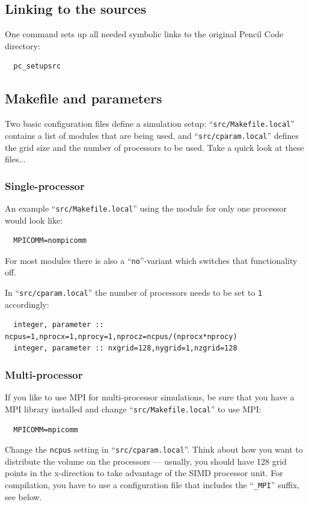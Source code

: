 \documentclass[a4paper,12pt]{article}
\newcommand{\file}[1]{``\texttt{#1}''}
\newcommand{\name}[1]{\textsc{#1}}
\newcommand{\code}[1]{\texttt{#1}}
\begin{document}
\subsection{Linking to the sources}

One command sets up all needed symbolic links to the original Pencil Code directory:
\begin{verbatim}
  pc_setupsrc
\end{verbatim}

\subsection{Makefile and parameters}

Two basic configuration files define a simulation setup: \file{src/Makefile.local} contains a list of modules that are being used, and \file{src/cparam.local} defines the grid size and the number of processors to be used.
Take a quick look at these files...


\subsubsection{Single-processor}
An example \file{src/Makefile.local} using the module for only one processor would look like:
\begin{verbatim}
  MPICOMM=nompicomm
\end{verbatim}

For most modules there is also a \file{no}-variant which switches that functionality off.

In \file{src/cparam.local} the number of processors needs to be set to \code{1} accordingly:
\begin{verbatim}
  integer, parameter :: ncpus=1,nprocx=1,nprocy=1,nprocz=ncpus/(nprocx*nprocy)
  integer, parameter :: nxgrid=128,nygrid=1,nzgrid=128
\end{verbatim}

\subsubsection{Multi-processor}
If you like to use \name{MPI} for multi-processor simulations, be sure that you have a \name{MPI} library installed and change \file{src/Makefile.local} to use \name{MPI}:
\begin{verbatim}
  MPICOMM=mpicomm
\end{verbatim}

Change the \code{ncpus} setting in \file{src/cparam.local}.
Think about how you want to distribute the volume on the processors --- usually, you should have 128 grid points in the x-direction to take advantage of the SIMD processor unit.
For compilation, you have to use a configuration file that includes the \file{\_MPI} suffix, see below.
\end{document}
